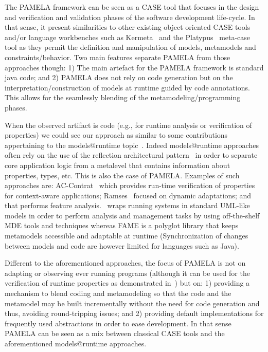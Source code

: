 The PAMELA framework can be seen as a CASE tool that focuses in the design and verification and validation phases of the software development life-cycle. In that sense, it present similarities to other existing object oriented CASE tools and/or language workbenches such as Kermeta~\cite{kermeta} and the Platypus~\cite{platypus} meta-case tool as they permit the definition and manipulation of models, metamodels and constraints/behavior. Two main features separate PAMELA from those approaches though: 1) The main artefact for the PAMELA framework is standard java code; and 2) PAMELA does not rely on code generation but on the interpretation/construction of models at runtime guided by code annotations. This allows for the seamlessly blending of the metamodeling/programming phases.

When the observed artifact is code (e.g., for runtime analysis or verification of properties) we could see our approach as similar to some contributions appertaining to the models@runtime topic~\cite{bencomo2019models}. Indeed models@runtime approaches often rely  on the use of the reflection architectural pattern~\cite{buschmann2008pattern} in order to separate core application logic from a metalevel that contains information about properties, types, etc. This is also the case of PAMELA. 
Examples of such approaches are: AC-Contrat~\cite{accontract} which provides run-time verification of properties for context-aware applications; Ramses~\cite{ramses} focused on dynamic adaptations; and \cite{denker2010modeling} that performs feature analysis.~\cite{song2010applying} wraps running systems in standard UML-like models in order to perform analysis and management tasks by using off-the-shelf MDE tools and techniques whereas FAME \cite{kuhn2008fame} is a polyglot library that keeps metamodels accessible and adaptable at runtime (Synchronization of changes between models and code are however limited for languages such as Java).

Different to the aforementioned approaches, the focus of PAMELA is not on adapting or observing ever running programs (although it can be used for the verification of runtime properties as demonstrated in~\cite{silva20}) but on: 1) providing a mechanism to blend coding and metamodeling so that the code and the metamodel may be built incrementally without the need for code generation and thus, avoiding round-tripping issues; and 2) providing default implementations for frequently used abstractions in order to ease development. In that sense PAMELA can be seen as a mix between classical CASE tools and the aforementioned models@runtime approaches.

